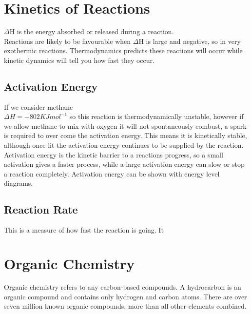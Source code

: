 \documentclass[a4paper, 12pt]{article}
\begin{document}
\newpage

\section{Kinetics of Reactions}
	$\Delta$H is the energy absorbed or released during a reaction. \\
	Reactions are likely to be favourable when $\Delta$H is large and negative, so in very exothermic reactions. Thermodynamics predicts these reactions will occur while kinetic dynamics will tell you how fast they occur. \\
	\subsection{Activation Energy}
		If we consider methane
		 \\
		$\Delta H =-802 KJmol^{-1}$ so this reaction is thermodynamically unstable, however if we allow methane to mix with oxygen it will not spontaneously combust, a spark is required to over come the activation energy. This means it is kinetically stable, although once lit the activation energy continues to be supplied by the reaction. \\
		Activation energy is the kinetic barrier to a reactions progress, so a small activation gives a faster process, while a large activation energy can slow or stop a reaction completely. Activation energy can be shown with energy level diagrams.
		
	\subsection{Reaction Rate}
		This is a measure of how fast the reaction is going. It 
		
\newpage

\section{Organic Chemistry}
	Organic chemistry refers to any carbon-based compounds. A hydrocarbon is an organic compound and contains only hydrogen and carbon atoms. There are over seven million known organic compounds, more than all other elements combined.
	
\end{document}
